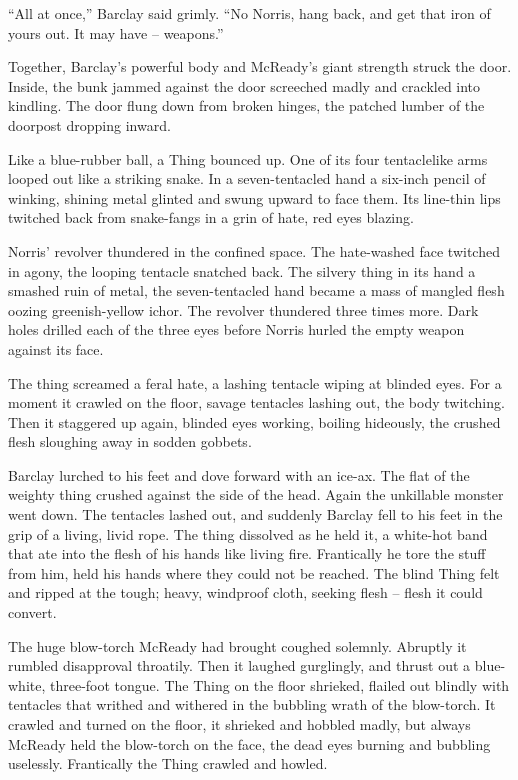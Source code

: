 \documentclass[letterpaper,openany,12pt]{memoir}		%
\begin{document}
``All at once,'' Barclay said grimly. ``No Norris, hang back, and get that iron
of yours out. It may have -- weapons.''

Together, Barclay's powerful body and McReady's giant strength struck the door.
Inside, the bunk jammed against the door screeched madly and crackled into
kindling. The door flung down from broken hinges, the patched lumber of the
doorpost dropping inward.

Like a blue-rubber ball, a Thing bounced up. One of its four tentaclelike arms
looped out like a striking snake. In a seven-tentacled hand a six-inch pencil of
winking, shining metal glinted and swung upward to face them. Its line-thin lips
twitched back from snake-fangs in a grin of hate, red eyes blazing.

Norris' revolver thundered in the confined space. The hate-washed face twitched
in agony, the looping tentacle snatched back. The silvery thing in its hand a
smashed ruin of metal, the seven-tentacled hand became a mass of mangled flesh
oozing greenish-yellow ichor. The revolver thundered three times more. Dark
holes drilled each of the three eyes before Norris hurled the empty weapon
against its face.

The thing screamed a feral hate, a lashing tentacle wiping at blinded eyes. For
a moment it crawled on the floor, savage tentacles lashing out, the body
twitching. Then it staggered up again, blinded eyes working, boiling hideously,
the crushed flesh sloughing away in sodden gobbets.

Barclay lurched to his feet and dove forward with an ice-ax. The flat of the
weighty thing crushed against the side of the head. Again the unkillable monster
went down. The tentacles lashed out, and suddenly Barclay fell to his feet in
the grip of a living, livid rope. The thing dissolved as he held it, a white-hot
band that ate into the flesh of his hands like living fire. Frantically he tore
the stuff from him, held his hands where they could not be reached. The blind
Thing felt and ripped at the tough; heavy, windproof cloth, seeking flesh --
flesh it could convert.

The huge blow-torch McReady had brought coughed solemnly. Abruptly it rumbled
disapproval throatily. Then it laughed gurglingly, and thrust out a blue-white,
three-foot tongue. The Thing on the floor shrieked, flailed out blindly with
tentacles that writhed and withered in the bubbling wrath of the blow-torch. It
crawled and turned on the floor, it shrieked and hobbled madly, but always
McReady held the blow-torch on the face, the dead eyes burning and bubbling
uselessly. Frantically the Thing crawled and howled.
\end{document}
